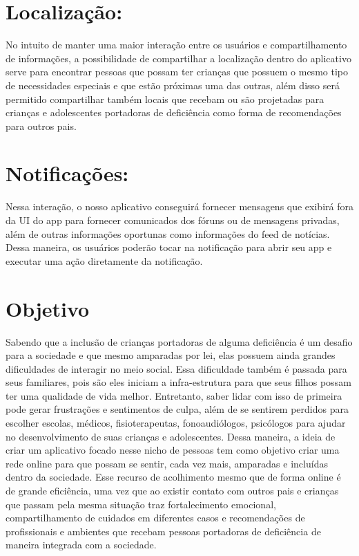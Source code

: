 \begin{apendicesenv}
	\section{Localização: }
	No intuito de manter uma maior interação entre os usuários e compartilhamento de informações, a possibilidade de compartilhar a localização dentro do aplicativo serve para encontrar pessoas que possam ter crianças que possuem o mesmo tipo de  necessidades especiais e que estão próximas uma das outras, além disso será permitido compartilhar também locais que recebam ou são projetadas para crianças e adolescentes portadoras de deficiência como forma de recomendações para outros pais. 
	
	\section{Notificações: }
	Nessa interação, o nosso aplicativo conseguirá fornecer mensagens que exibirá fora da UI do app para fornecer comunicados dos fóruns ou de mensagens privadas, além de outras informações oportunas como informações do feed de notícias. Dessa maneira, os usuários poderão tocar na notificação para abrir seu app e executar uma ação diretamente da notificação. 
	
	
	
	\section{Objetivo}
	Sabendo que a inclusão de crianças portadoras de alguma deficiência é um desafio para a sociedade e que mesmo amparadas por lei, elas possuem ainda grandes dificuldades de interagir no meio social. Essa dificuldade também é passada para seus familiares, pois são eles iniciam a infra-estrutura para que seus filhos possam ter uma qualidade de vida melhor. Entretanto, saber lidar com isso de primeira pode gerar frustrações e sentimentos de culpa, além de se sentirem perdidos para escolher escolas, médicos, fisioterapeutas, fonoaudiólogos, psicólogos para ajudar no desenvolvimento de suas crianças e adolescentes.  Dessa maneira, a ideia de criar um aplicativo focado nesse nicho de pessoas tem como objetivo criar uma rede online para que possam se sentir, cada vez mais, amparadas e incluídas dentro da sociedade. Esse recurso de acolhimento mesmo que de forma online é de grande eficiência, uma vez que ao existir contato com outros pais e crianças que passam pela mesma situação traz fortalecimento emocional, compartilhamento de cuidados em diferentes casos e recomendações de profissionais e ambientes que recebam pessoas portadoras de deficiência de maneira integrada com a sociedade.
	

\end{apendicesenv}
